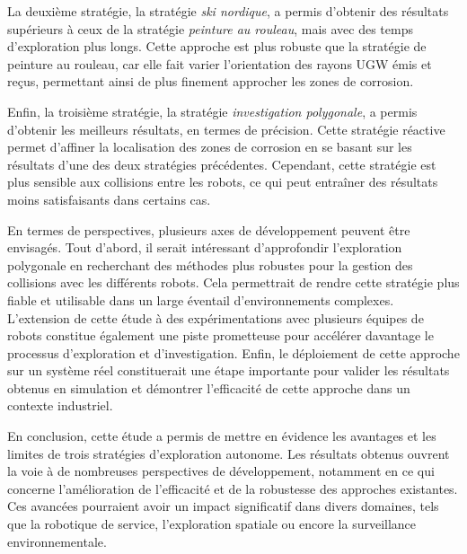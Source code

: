 \documentclass[english,RandD]{rapportPFE}  %
\begin{document}
		La deuxième stratégie, la stratégie \textit{ski nordique}, a permis d'obtenir des résultats supérieurs à ceux de la stratégie \textit{peinture au rouleau}, mais avec des temps d'exploration plus longs.
		Cette approche est plus robuste que la stratégie de peinture au rouleau, car elle fait varier l'orientation des rayons UGW émis et reçus, permettant ainsi de plus finement approcher les zones de corrosion.

		Enfin, la troisième stratégie, la stratégie \textit{investigation polygonale}, a permis d'obtenir les meilleurs résultats, en termes de précision.
		Cette stratégie réactive permet d'affiner la localisation des zones de corrosion en se basant sur les résultats d'une des deux stratégies précédentes.
		Cependant, cette stratégie est plus sensible aux collisions entre les robots, ce qui peut entraîner des résultats moins satisfaisants dans certains cas.

		En termes de perspectives, plusieurs axes de développement peuvent être envisagés.
		Tout d'abord, il serait intéressant d'approfondir l'exploration polygonale en recherchant des méthodes plus robustes pour la gestion des collisions avec les différents robots.
		Cela permettrait de rendre cette stratégie plus fiable et utilisable dans un large éventail d'environnements complexes.
		L'extension de cette étude à des expérimentations avec plusieurs équipes de robots constitue également une piste prometteuse pour accélérer davantage le processus d'exploration et d'investigation.
		Enfin, le déploiement de cette approche sur un système réel constituerait une étape importante pour valider les résultats obtenus en simulation et démontrer l'efficacité de cette approche dans un contexte industriel.

		En conclusion, cette étude a permis de mettre en évidence les avantages et les limites de trois stratégies d'exploration autonome. Les résultats obtenus ouvrent la voie à de nombreuses perspectives de développement, notamment en ce qui concerne l'amélioration de l'efficacité et de la robustesse des approches existantes. Ces avancées pourraient avoir un impact significatif dans divers domaines, tels que la robotique de service, l'exploration spatiale ou encore la surveillance environnementale.
	
	
	\appendix
\end{document}
